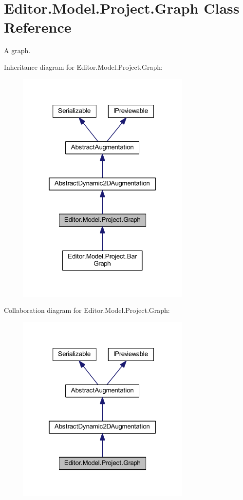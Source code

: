 \section{Editor.\-Model.\-Project.\-Graph Class Reference}
\label{class_editor_1_1_model_1_1_project_1_1_graph}


A graph.  




Inheritance diagram for Editor.\-Model.\-Project.\-Graph\-:
\nopagebreak
\begin{figure}[H]
\begin{center}
\leavevmode
\includegraphics[width=244pt]{class_editor_1_1_model_1_1_project_1_1_graph__inherit__graph}
\end{center}
\end{figure}


Collaboration diagram for Editor.\-Model.\-Project.\-Graph\-:
\nopagebreak
\begin{figure}[H]
\begin{center}
\leavevmode
\includegraphics[width=244pt]{class_editor_1_1_model_1_1_project_1_1_graph__coll__graph}
\end{center}
\end{figure}
